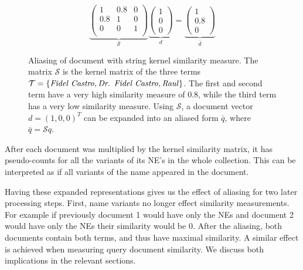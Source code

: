 \begin{figure}[ht]
  \caption{Aliasing of document with string kernel similarity measure.
The matrix $\mathcal{S}$ is the kernel matrix of the three terms $\mathcal{T} = \lbrace
\text{\emph{Fidel Castro}},\text{\emph{Dr. Fidel Castro}}, \text{\emph{Raul}}\rbrace$. The first and second term have a
very high similarity measure of $0.8$, while the third term has a very low similarity measure. Using
$\mathcal{S}$, a document vector $d=(1,0,0)^T$ can be expanded into an aliased form
$\bar q$, where $\bar q = \mathcal{S}q$.}
  \[
     \underbrace{\begin{pmatrix}
      1   & 0.8 & 0\\
      0.8 & 1   & 0\\
      0   & 0   & 1\\
     \end{pmatrix}}_{\mathcal{S}}
     \underbrace{\begin{pmatrix}
     1\\ 0\\0 
     \end{pmatrix}}_{d}
     =
     \underbrace{\begin{pmatrix}
     1\\ 0.8\\0 
     \end{pmatrix}}_{\bar d}
  \]
  \label{eq:example_string_sim}
\end{figure}

After each document was multiplied by the kernel similarity matrix, it has pseudo-counts for all the variants of its NE's in the whole collection. This can be interpreted as if all variants of the name appeared in the document. 

Having these expanded representations gives us the effect of aliasing for two later processing steps. First, name variants no longer effect similarity measurements. For example if previously document 1 would have only the NEs  and document 2 would have only the NEs  their similarity would be 0. After the aliasing, both documents contain both terms, and thus have maximal similarity. A similar effect is achieved when measuring query document similarity. We discuss both implications in the relevant sections.


